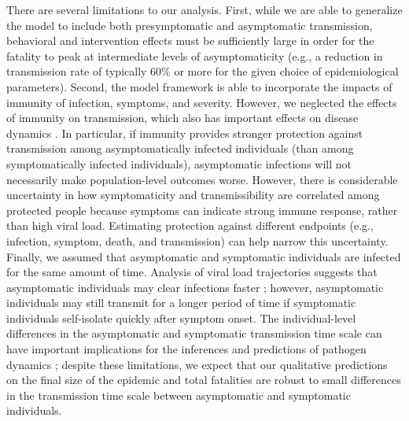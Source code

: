 \documentclass[12pt]{article}
\begin{document}
There are several limitations to our analysis.
First, while we are able to generalize the model to include both presymptomatic and asymptomatic transmission, behavioral and intervention effects must be sufficiently large in order for the fatality to peak at intermediate levels of asymptomaticity (e.g., a reduction in transmission rate of typically 60\% or more for the given choice of epidemiological parameters).
Second, the model framework is able to incorporate the impacts of immunity of infection, symptoms, and severity. 
However, we neglected the effects of immunity on transmission, which also has important effects on disease dynamics \citep{saad2020immune}.
In particular, if immunity provides stronger protection against transmission among asymptomatically infected individuals (than among symptomatically infected individuals), asymptomatic infections will not necessarily make population-level outcomes worse. 
However, there is considerable uncertainty in how symptomaticity and transmissibility are correlated among protected people because symptoms can indicate strong immune response, rather than high viral load. 
Estimating protection against different endpoints (e.g., infection, symptom, death, and transmission) can help narrow this uncertainty.
Finally, we assumed that asymptomatic and symptomatic individuals are infected for the same amount of time.
Analysis of viral load trajectories suggests that asymptomatic individuals may clear infections faster \citep{Kissler2020};
however, asymptomatic individuals may still transmit for a longer period of time if symptomatic individuals self-isolate quickly after symptom onset.
The individual-level differences in the asymptomatic and symptomatic transmission time scale can have important implications for the inferences and predictions of pathogen dynamics \citep{park2020time,harris2022time};
despite these limitations, we expect that our qualitative predictions on the final size of the epidemic and total fatalities are robust to small differences in the transmission time scale between asymptomatic and symptomatic individuals.
\end{document}
